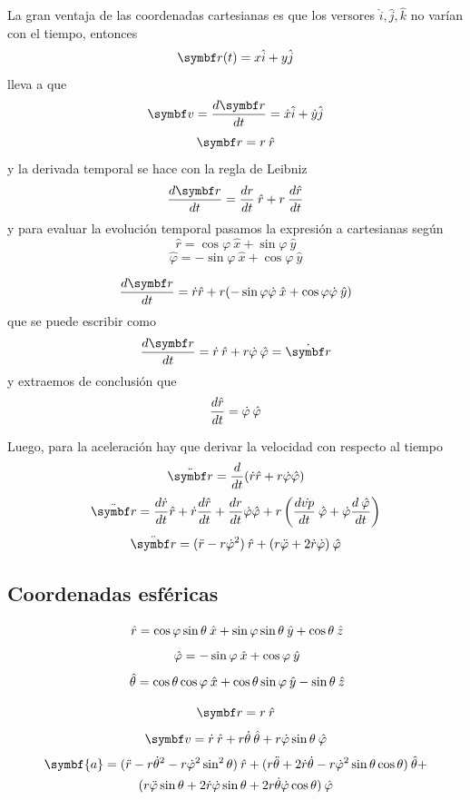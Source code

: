 \documentclass[10pt,oneside]{CBFT_book}
\begin{document}
La gran ventaja de las coordenadas cartesianas es que los versores $ \hat{i}, \hat{j}, \hat{k}$ no varían con el tiempo,
entonces
\[
	\vb{r}(t) = x \hat{i} + y \hat{j}
\]
lleva a que 
\[
	\vb{v} = \dtot{\vb{r}}{t} = \dot{x}\hat{i} + \dot{y}\hat{j}
\]
\[
	\vb{r} = r \:\hat{r}
\]
y la derivada temporal se hace con la regla de Leibniz
\[
	\dtot{\vb{r}}{t} = \dtot{r}{t} \:\hat{r} + r \:\dtot{\hat{r}}{t}
\]
y para evaluar la evolución temporal pasamos la expresión a cartesianas según
\[
	\hat{r} = \cos \varphi \:\hat{x} + \sin \varphi \:\hat{y}
\]
\[
	\hat{\varphi} = -\sin \varphi  \:\hat{x} + \cos  \varphi \:\hat{y}
\]

\[
	\dtot{\vb{r}}{t} = \dot{r} \hat{r } + r( - \sin \vp \dot{\vp} \:\hat{x} + \cos \vp \dot{\vp} \:\hat{y} )
\]
que se puede escribir como 
\[
	\dtot{\vb{r}}{t} = \dot{r} \: \hat{r } + r \dot{\vp} \: \hat{\vp} = \dot{\vb{r}}
\]
y extraemos de conclusión que 
\[
	\frac{d^{\hspace{-0.05em}} {\hat{r}}}{d {t}^{\hspace{-0.05em}}} = \dot{\varphi} \: \hat{\varphi}
\]

Luego, para la aceleración hay que derivar la velocidad con respecto al tiempo
\[
	\ddot{\vb{r}} = \dtot{}{t} ( \dot{r} \hat{r} + r\dot{\vp} \hat{\vp} ) 
\]
\[
	\ddot{\vb{r}} = \dtot{\dot{r}}{t} \hat{r} + \dot{r}\dtot{\hat{r}}{t} + \dtot{r}{t} \dot{\vp} \hat{\vp}
	+ r \left( \dtot{\dot{vp}}{t}\phiver + \dot{\vp}\dtot{\phiver}{t} \right)
\]
\[
	\ddot{\vb{r}} = ( \ddot{r} - r\dot{\vp}^2 ) \rver + ( r\ddot{\vp} + 2 \dot{r} \dot{\vp} ) \phiver
\]
\subsection{Coordenadas esféricas}

\[
	\:\hat{r} = \cos\varphi \sin\theta\:\hat{x} + \sin\varphi\sin\theta\:\hat{y} + \cos\theta\:\hat{z}
\]
\[
	\:\hat{\varphi} = -\sin\varphi \:\hat{x} + \cos\varphi \:\hat{y}
\]
\[
	\:\hat{\theta} = \cos\theta \cos\varphi \:\hat{x} + \cos\theta\sin\varphi\:\hat{y} - \sin\theta\:\hat{z}
\]

\[
	\vb{r} = r \rver
\]
\[
	\vb{v} = \dot{r} \rver + r\dot{\theta}\thetaver + r\dot{\vp}\sin\theta\phiver
\]
\begin{multline*} %
	\symbf{a} = ( \ddot{r} - r\dot{\theta}^2 - r\dot{\vp}^2 \sin^2 \theta )\rver +
	( r\ddot{\theta} + 2\dot{r}\dot{\theta} - r\dot{\vp}^2 \sin \theta \cos\theta )\thetaver + \\
	( r\ddot{\vp}\sin\theta + 2\dot{r}\dot{\vp}\sin\theta + 2r\dot{\theta}\dot{\vp}\cos\theta )\phiver 
\end{multline*}
	
\end{document}
